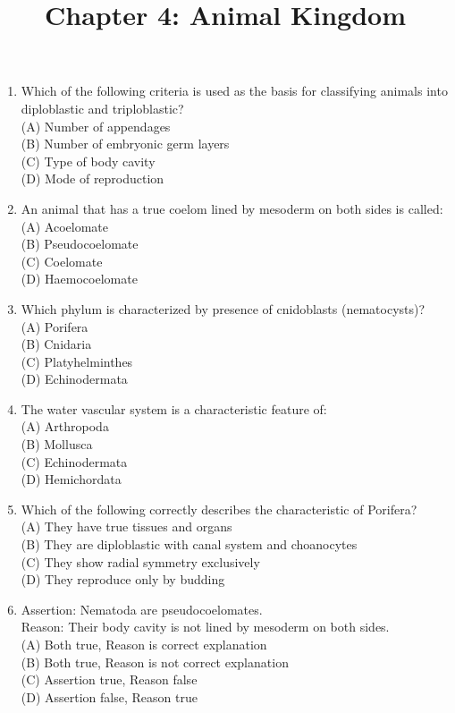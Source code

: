 \documentclass{article}
\begin{document}
\title{Chapter 4: Animal Kingdom}
\date{}
\maketitle

\begin{enumerate}[label=Q\arabic*.]

\item Which of the following criteria is used as the basis for classifying animals into diploblastic and triploblastic?
\\(A) Number of appendages
\\(B) Number of embryonic germ layers
\\(C) Type of body cavity
\\(D) Mode of reproduction

\item An animal that has a true coelom lined by mesoderm on both sides is called:
\\(A) Acoelomate
\\(B) Pseudocoelomate
\\(C) Coelomate
\\(D) Haemocoelomate

\item Which phylum is characterized by presence of cnidoblasts (nematocysts)?
\\(A) Porifera
\\(B) Cnidaria
\\(C) Platyhelminthes
\\(D) Echinodermata

\item The water vascular system is a characteristic feature of:
\\(A) Arthropoda
\\(B) Mollusca
\\(C) Echinodermata
\\(D) Hemichordata

\item Which of the following correctly describes the characteristic of Porifera?
\\(A) They have true tissues and organs
\\(B) They are diploblastic with canal system and choanocytes
\\(C) They show radial symmetry exclusively
\\(D) They reproduce only by budding

\item Assertion: Nematoda are pseudocoelomates.\\
Reason: Their body cavity is not lined by mesoderm on both sides.
\\(A) Both true, Reason is correct explanation
\\(B) Both true, Reason is not correct explanation
\\(C) Assertion true, Reason false
\\(D) Assertion false, Reason true


\end{enumerate}
\end{document}
